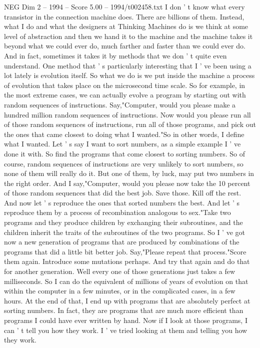 \begin{textsample}{NEG Dim 2 – 1994 – Score 5.00 – 1994/t002458.txt}
I don ' t know what every transistor in the connection machine does.
There are billions of them.
Instead, what I do and what the designers at Thinking Machines do is we think at some level of abstraction and then we hand it to the machine and the machine takes it beyond what we could ever do, much farther and faster than we could ever do.
And in fact, sometimes it takes it by methods that we don ' t quite even understand.
One method that ' s particularly interesting that I ' ve been using a lot lately is evolution itself.
So what we do is we put inside the machine a process of evolution that takes place on the microsecond time scale.
So for example, in the most extreme cases, we can actually evolve a program by starting out with random sequences of instructions.
Say,"Computer, would you please make a hundred million random sequences of instructions.
Now would you please run all of those random sequences of instructions, run all of those programs, and pick out the ones that came closest to doing what I wanted."So in other words, I define what I wanted.
Let ' s say I want to sort numbers, as a simple example I ' ve done it with.
So find the programs that come closest to sorting numbers.
So of course, random sequences of instructions are very unlikely to sort numbers, so none of them will really do it.
But one of them, by luck, may put two numbers in the right order.
And I say,"Computer, would you please now take the 10 percent of those random sequences that did the best job.
Save those.
Kill off the rest.
And now let ' s reproduce the ones that sorted numbers the best.
And let ' s reproduce them by a process of recombination analogous to sex."Take two programs and they produce children by exchanging their subroutines, and the children inherit the traits of the subroutines of the two programs.
So I ' ve got now a new generation of programs that are produced by combinations of the programs that did a little bit better job.
Say,"Please repeat that process."Score them again.
Introduce some mutations perhaps.
And try that again and do that for another generation.
Well every one of those generations just takes a few milliseconds.
So I can do the equivalent of millions of years of evolution on that within the computer in a few minutes, or in the complicated cases, in a few hours.
At the end of that, I end up with programs that are absolutely perfect at sorting numbers.
In fact, they are programs that are much more efficient than programs I could have ever written by hand.
Now if I look at those programs, I can ' t tell you how they work.
I ' ve tried looking at them and telling you how they work.

\end{textsample}
